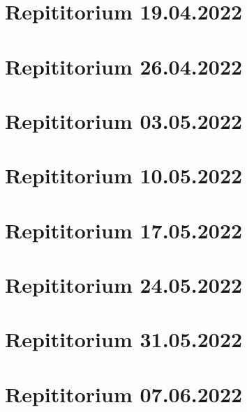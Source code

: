 \documentclass[a4paper,12pt]{article}
\begin{document}
\tableofcontents
\newpage
\section{Repititorium 19.04.2022}

\newpage
\section{Repititorium 26.04.2022}

\newpage
\section{Repititorium 03.05.2022}

\newpage
\section{Repititorium 10.05.2022}

\newpage
\section{Repititorium 17.05.2022}

\newpage
\section{Repititorium 24.05.2022}

\newpage
\section{Repititorium 31.05.2022}

\newpage
\section{Repititorium 07.06.2022}

\end{document}
